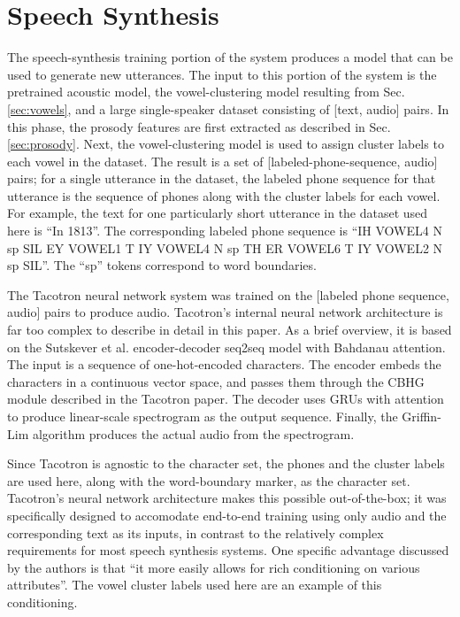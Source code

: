 \documentclass{article}
\begin{document}
\section{Speech Synthesis}
\label{sec:tacotron}

The speech-synthesis training portion of the system produces a model that can be used to generate new utterances. The input to this portion of the system is the pretrained acoustic model, the vowel-clustering model resulting from Sec. \ref{sec:vowels}, and a large single-speaker dataset consisting of [text, audio] pairs.
In this phase, the prosody features are first extracted as described in Sec. \ref{sec:prosody}. Next, the vowel-clustering model is used to assign cluster labels to each vowel in the dataset.
The result is a set of [labeled-phone-sequence, audio] pairs; for a single utterance in the dataset, the labeled phone sequence for that utterance is the sequence of phones along with the cluster labels for each vowel. For example, the text for one particularly short utterance in the dataset used here is ``In 1813''.
The corresponding labeled phone sequence is ``IH VOWEL4 N sp SIL EY VOWEL1 T IY VOWEL4 N sp TH ER VOWEL6 T IY VOWEL2 N sp SIL''. The ``sp'' tokens correspond to word boundaries.

The Tacotron \cite{wang2017tacotron} neural network system was trained on the [labeled phone sequence, audio] pairs to produce audio.
Tacotron's internal neural network architecture is far too complex to describe in detail in this paper. As a brief overview, it is based on the Sutskever et al. \cite{sutskever2014sequence} encoder-decoder seq2seq model with Bahdanau \cite{bahdanau2014neural} attention. The input is a sequence of one-hot-encoded characters.
The encoder embeds the characters in a continuous vector space, and passes them through the CBHG module described in the Tacotron paper.
The decoder uses GRUs with attention to produce linear-scale spectrogram as the output sequence. Finally, the Griffin-Lim algorithm produces the actual audio from the spectrogram.

Since Tacotron is agnostic to the character set, the phones and the cluster labels are used here, along with the word-boundary marker, as the character set. Tacotron's neural network architecture makes this possible out-of-the-box; it was specifically designed to accomodate end-to-end training using only audio and the corresponding text as its inputs, in contrast to the relatively complex requirements for most speech synthesis systems.
One specific advantage discussed by the authors is that ``it more easily
allows for rich conditioning on various attributes''. The vowel cluster labels used here are an example of this conditioning.
\end{document}
